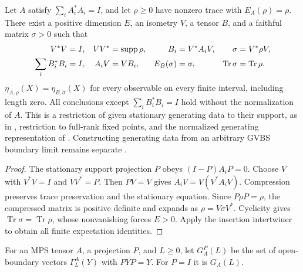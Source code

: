 \begin{lemma}
    \label{thm:stationary_support_faithful_generators}
    \leanok
    Let $A$ satisfy $\sum_iA_i^*A_i=I$, and let $\rho\geq0$ have nonzero
    trace with $E_A(\rho)=\rho$. There exist a positive dimension $E$, an
    isometry $V$, a tensor $B$, and a faithful matrix $\sigma>0$ such that
    \begin{align}
        V^*V                    & =I,                           & VV^*   & =\operatorname{supp}\rho, &
        B_i                     & =V^*A_iV,                     & \sigma & =V^*\rho V,\notag           \\
        \sum_iB_i^*B_i          & =I,                           & A_iV   & =VB_i,                    &
        E_B(\sigma)             & =\sigma,                      &
        \operatorname{Tr}\sigma & =\operatorname{Tr}\rho.\notag
    \end{align}
    $\eta_{A,\rho}(X)=\eta_{B,\sigma}(X)$ for every observable
    on every finite interval, including length zero.
    All conclusions except $\sum_iB_i^*B_i=I$ hold without the
    normalization of $A$.
    This is a restriction of given stationary generating data to their
    support, as in \cite{Wolf2012Quantum}, restriction to full-rank fixed
    points, and the normalized generating representation of
    \cite[Section~3]{Nachtergaele1996Spectral}. Constructing generating
    data from an arbitrary GVBS boundary limit remains separate
    \cite{gap:nachtergaele96_infinite_volume_ground_projection}.
\end{lemma}
\begin{proof}\leanok
    The stationary support projection $P$ obeys $(I-P)A_iP=0$.
    Choose $V$ with $V^*V=I$ and $VV^*=P$. Then $PV=V$ gives
    $A_iV=V(V^*A_iV)$. Compression preserves trace preservation and the
    stationary equation. Since $P\rho P=\rho$, the compressed matrix is
    positive definite and expands as $\rho=V\sigma V^*$.
    Cyclicity gives $\operatorname{Tr}\sigma=\operatorname{Tr}\rho$,
    whose nonvanishing forces $E>0$. Apply the insertion intertwiner to
    obtain all finite expectation identities.
\end{proof}

\begin{definition}
    \label{def:corner_boundary_space}
    \leanok
    For an MPS tensor $A$, a projection $P$, and $L\geq0$, let $G_A^P(L)$
    be the set of open-boundary vectors $\Gamma_L^A(Y)$ with $PYP=Y$.
    For $P=I$ it is $G_A(L)$.
\end{definition}

